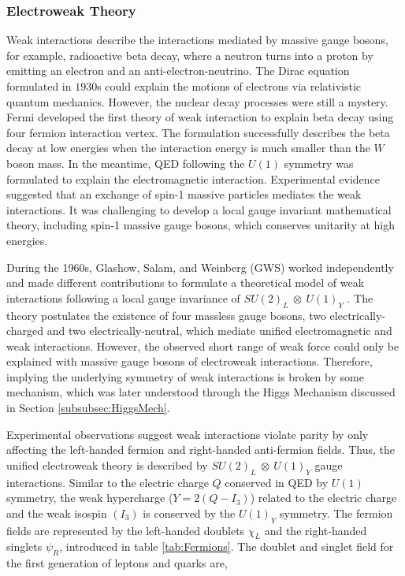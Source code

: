 \subsubsection{Electroweak Theory}
\label{subsubsec:EWkUni}
Weak interactions describe the interactions mediated by massive gauge bosons, for example, radioactive beta decay, where a neutron turns into a proton by emitting an electron and an anti-electron-neutrino. The Dirac equation formulated in $1930$s could explain the motions of electrons via relativistic quantum mechanics. However, the nuclear decay processes were still a mystery. Fermi developed the first theory of weak interaction to explain beta decay using four fermion interaction vertex. The formulation successfully describes the beta decay at low energies when the interaction energy is much smaller than the $W$ boson mass. In the meantime, QED following the $U(1)$ symmetry was formulated to explain the electromagnetic interaction. Experimental evidence suggested that an exchange of spin-1 massive particles mediates the weak interactions. It was challenging to develop a local gauge invariant mathematical theory, including spin-1 massive gauge bosons, which conserves unitarity at high energies. 

During the 1960s, Glashow, Salam, and Weinberg (GWS) worked independently and made different contributions to formulate a theoretical model of weak interactions following a local gauge invariance of $SU(2)_{L}~\otimes~U(1)_{Y}$ \cite{GLASHOW1961579}\cite{EWK_W}\cite{EWK_S}. The theory postulates the existence of four massless gauge bosons, two electrically-charged and two electrically-neutral, which mediate unified electromagnetic and weak interactions. However, the observed short range of weak force could only be explained with massive gauge bosons of electroweak interactions. Therefore, implying the underlying symmetry of weak interactions is broken by some mechanism, which was later understood through the Higgs Mechanism discussed in Section \ref{subsubsec:HiggsMech}. 

Experimental observations suggest weak interactions violate parity by only affecting the left-handed fermion and right-handed anti-fermion fields. Thus, the unified electroweak theory is described by $SU(2)_{L}~\otimes~U(1)_{Y}$ gauge interactions. Similar to the electric charge $Q$ conserved in QED by $U(1)$ symmetry, the weak hypercharge ($Y=2(Q-I_{3})$) related to the electric charge and the weak isospin $(I_{3})$ is conserved by the $U(1)_{Y}$ symmetry. The fermion fields are represented by the left-handed doublets $\chi_{L}$ and the right-handed singlets $\psi_{R}$, introduced in table \ref{tab:Fermions}. The doublet and singlet field for the first generation of leptons and quarks are, 

